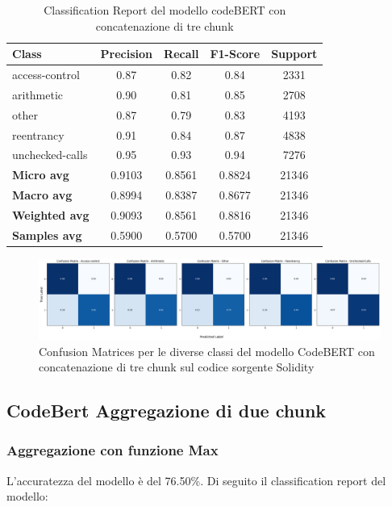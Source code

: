 \documentclass[../../Thesis.tex]{subfiles}
\begin{document}
\begin{table}[H]
\centering
\small
\begin{tabular}{lcccc}
\hline
\textbf{Class} & \textbf{Precision} & \textbf{Recall} & \textbf{F1-Score} & \textbf{Support} \\
\hline
access-control & 0.87 & 0.82 & 0.84 & 2331 \\
arithmetic & 0.90 & 0.81 & 0.85 & 2708 \\
other & 0.87 & 0.79 & 0.83 & 4193 \\
reentrancy & 0.91 & 0.84 & 0.87 & 4838 \\
unchecked-calls & 0.95 & 0.93 & 0.94 & 7276 \\
\hline
\textbf{Micro avg} & 0.9103 & 0.8561 & 0.8824 & 21346 \\
\textbf{Macro avg} & 0.8994 & 0.8387 & 0.8677 & 21346 \\
\textbf{Weighted avg} & 0.9093 & 0.8561 & 0.8816 & 21346 \\
\textbf{Samples avg} & 0.5900 & 0.5700 & 0.5700 & 21346 \\
\hline
\end{tabular}
\caption{Classification Report del modello codeBERT con concatenazione di tre chunk}
\end{table}

\begin{figure}[H]
    \includegraphics[width=1.05\textwidth]{../../img/CFConcat3-SC.png}
    \caption{Confusion Matrices per le diverse classi del modello CodeBERT con concatenazione di tre chunk sul codice sorgente Solidity}
\end{figure}

\subsection{CodeBert Aggregazione di due chunk}
\subsubsection{Aggregazione con funzione Max}
L'accuratezza del modello è del 76.50\%. Di seguito il classification report del modello:
\end{document}
